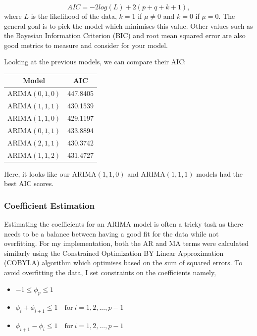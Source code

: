 \documentclass{article}
\begin{document}
  \begin{equation*}
    AIC = -2log(L) + 2(p + q + k + 1),
  \end{equation*}
  where $L$ is the likelihood of the data, $k = 1$ if $\mu \ne 0$ and $k = 0$ if $\mu = 0$. The general goal is to pick the model which minimises this value. Other values such as the Bayesian Information Criterion (BIC) and root mean squared error are also good metrics to measure and consider for your model.

  Looking at the previous models, we can compare their AIC:
  \begin{center}
    \begin{tabular}{||c c||} 
     \hline
     Model & AIC \\ [0.5ex] 
     \hline\hline
     ARIMA$(0,1,0)$ & 447.8405 \\ 
     \hline
     ARIMA$(1,1,1)$ & 430.1539 \\
     \hline
     ARIMA$(1,1,0)$ & 429.1197 \\ 
     \hline
     ARIMA$(0,1,1)$ & 433.8894 \\
     \hline
     ARIMA$(2,1,1)$ & 430.3742 \\
     \hline
     ARIMA$(1,1,2)$ & 431.4727 \\
     \hline
    \end{tabular}
  \end{center}
  Here, it looks like our ARIMA$(1,1,0)$ and ARIMA$(1,1,1)$ models had the best AIC scores.

  \subsubsection{Coefficient Estimation}
  Estimating the coefficients for an ARIMA model is often a tricky task as there needs to be a balance between having a good fit for the data while not overfitting. For my implementation, both the AR and MA terms were calculated similarly using the Constrained Optimization BY Linear Approximation (COBYLA) algorithm which optimises based on the sum of squared errors. To avoid overfitting the data, I set constraints on the coefficients namely,
  \begin{itemize}
    \item $-1 \leq \phi_p \leq 1$
    \item $\phi_i + \phi_{i+1} \leq 1 \quad \text{for} \ i=1,2,...,p-1$
    \item $\phi_{i+1} - \phi_i \leq 1 \quad \text{for} \ i=1,2,...,p-1$
  \end{itemize}
  
\end{document}
